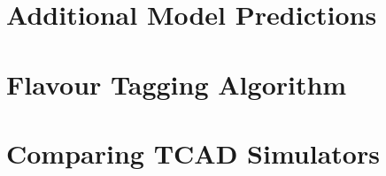 \chapter{Additional Model Predictions}
\label{sec:additional}

\chapter{Flavour Tagging Algorithm}

\chapter{Comparing TCAD Simulators}
\label{chap:TCADComparison}
